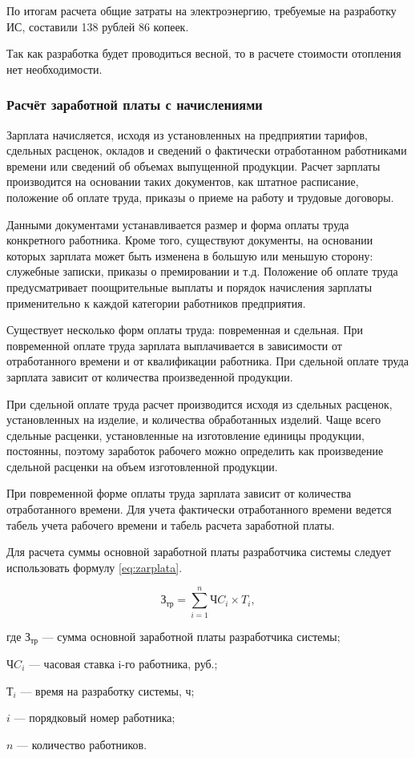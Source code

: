По итогам расчета общие затраты на электроэнергию, требуемые на разработку ИС, составили 138 рублей 86 копеек.

Так как разработка будет проводиться весной, то в расчете стоимости отопления нет необходимости.

\subsubsection{Расчёт заработной платы с начислениями}

Зарплата начисляется, исходя из установленных на предприятии тарифов, сдельных расценок, окладов и сведений о фактически отработанном работниками времени или сведений об объемах выпущенной продукции.
Расчет зарплаты производится на основании таких документов, как штатное расписание, положение об оплате труда, приказы о приеме на работу и трудовые договоры.

Данными документами устанавливается размер и форма оплаты труда конкретного работника.
Кроме того, существуют документы, на основании которых зарплата может быть изменена в большую или меньшую сторону: служебные записки, приказы о премировании и т.д.
Положение об оплате труда предусматривает поощрительные выплаты и порядок начисления зарплаты применительно к каждой категории работников предприятия. 

Существует несколько форм оплаты труда: повременная и сдельная. При повременной оплате труда зарплата выплачивается в зависимости от отработанного времени и от квалификации работника.
При сдельной оплате труда зарплата зависит от количества произведенной продукции. 

При сдельной оплате труда расчет производится исходя из сдельных расценок, установленных на изделие, и количества обработанных изделий. Чаще всего сдельные расценки, установленные на изготовление единицы продукции, постоянны, поэтому заработок рабочего можно определить как произведение сдельной расценки на объем изготовленной продукции.

При повременной форме оплаты труда зарплата зависит от количества отработанного времени. Для учета фактически отработанного времени ведется табель учета рабочего времени и табель расчета заработной платы.

Для расчета суммы основной заработной платы разработчика системы следует использовать формулу \ref{eq:zarplata}. 

\begin{equation}
	\label{eq:zarplata}
	З_{тр} =  \sum^{n}_{i=1} ЧC_i \times T_i,
\end{equation}
\begin{ESKDexplanation}
	\item где $З_{тр}$ --- сумма основной заработной платы разработчика системы;
	\item $ЧC_i$ --- часовая ставка i-го работника, руб.;
	\item $Т_{i}$ --- время на разработку системы, ч;
	\item $i$ --- порядковый номер работника;
	\item $n$ --- количество работников.
\end{ESKDexplanation}

